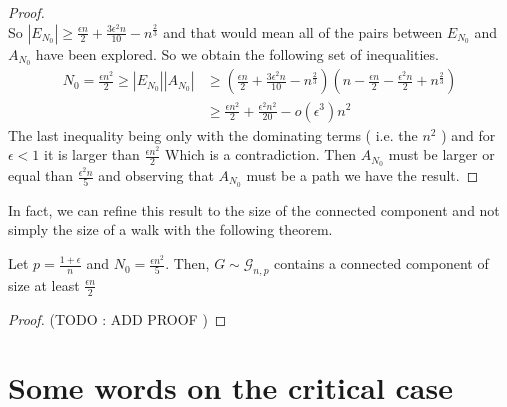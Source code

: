 \begin{proof}
\begin{equation}
	\end{equation}
	So $|E_{N_0}| \geq \frac{\epsilon n}{2} + \frac{3\epsilon^2n}{10} - n^{\frac{2}{3}}$ and that would mean all of the pairs between $E_{N_0}$ and $A_{N_0}$ have been explored.
	So we obtain the following set of inequalities.
	\begin{align}
		N_0 = \frac{\epsilon n^2}{2} \geq |E_{N_0}||A_{N_0}| &\geq (\frac{\epsilon n}{2} + \frac{3\epsilon^2n}{10} - n^{\frac{2}{3}} )
									(n - \frac{\epsilon n}{2} - \frac{\epsilon^2 n}{2} + n^{\frac{2}{3}})\\
									&\geq \frac{\epsilon n^2}{2} + \frac{\epsilon ^2 n^2 }{20} - o(\epsilon ^3)n^2 			
	\end{align}
	The last inequality being only with the dominating terms ( i.e. the $n^2$ ) and for $\epsilon < 1$ it is larger than $\frac{\epsilon n^2}{2}$ Which is a contradiction.
	Then $A_{N_0}$ must be larger or equal than $\frac{\epsilon ^2n}{5}$ and observing that $A_{N_0}$ must be a path we have the result.
\end{proof}
In fact, we can refine this result to the size of the connected component and not simply the size of a walk with the following theorem.
\begin{theorem}
	Let $p = \frac{1+\epsilon}{n}$ and $N_0 = \frac{\epsilon n^2}{5}$. Then, $G \sim \mathcal{G}_{n,p}$ contains a connected component of size at least $\frac{\epsilon n}{2}$
\end{theorem}
\begin{proof}
	(TODO : ADD PROOF )
\end{proof}
\section{Some words on the critical case}
